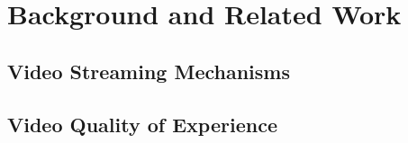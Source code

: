 \section{Background and Related Work}\label{sec:application:background}
\subsection{Video Streaming Mechanisms}\label{sec:application:background:video_streaming_mechanisms}
\subsection{Video Quality of Experience}\label{sec:application:background:video_qoe}